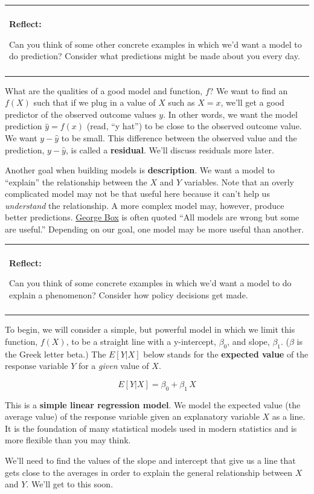 \documentclass[
]{book}
\newenvironment{reflect}
{
    \begin{center}
    
    \begin{tabular}{|p{0.8\textwidth}|}
    \rowcolor{LightBlue}
    \hline\\
    \rowcolor{LightBlue}
    \textbf{Reflect:}
}
{
    \\\rowcolor{LightBlue}
    \\\hline
    \end{tabular} 
    \end{center}
}
\begin{document}
\begin{reflect}
Can you think of some other concrete examples in which we'd want a model
to do prediction? Consider what predictions might be made about you
every day.
\end{reflect}

What are the qualities of a good model and function, \(f\)? We want to find an \(f(X)\) such that if we plug in a value of \(X\) such as \(X=x\), we'll get a good predictor of the observed outcome values \(y\). In other words, we want the model prediction \(\hat{y}=f(x)\) (read, ``y hat'') to be close to the observed outcome value. We want \(y-\hat{y}\) to be small. This difference between the observed value and the prediction, \(y-\hat{y}\), is called a \textbf{residual}. We'll discuss residuals more later.

Another goal when building models is \textbf{description}. We want a model to ``explain'' the relationship between the \(X\) and \(Y\) variables. Note that an overly complicated model may not be that useful here because it can't help us \emph{understand} the relationship. A more complex model may, however, produce better predictions. \href{https://en.wikipedia.org/wiki/George_E._P._Box}{George Box} is often quoted ``All models are wrong but some are useful.'' Depending on our goal, one model may be more useful than another.

\begin{reflect}
Can you think of some concrete examples in which we'd want a model to do
explain a phenomenon? Consider how policy decisions get made.
\end{reflect}

To begin, we will consider a simple, but powerful model in which we limit this function, \(f(X)\), to be a straight line with a y-intercept, \(\beta_0\), and slope, \(\beta_1\). (\(\beta\) is the Greek letter beta.) The \(E[Y | X]\) below stands for the \textbf{expected value} of the response variable \(Y\) for a \emph{given} value of \(X\).

\[E[Y | X] = \beta_0 + \beta_1\,X\]

This is a \textbf{simple linear regression model}. We model the expected value (the average value) of the response variable given an explanatory variable \(X\) as a line. It is the foundation of many statistical models used in modern statistics and is more flexible than you may think.

We'll need to find the values of the slope and intercept that give us a line that gets close to the averages in order to explain the general relationship between \(X\) and \(Y\). We'll get to this soon.
\end{document}
